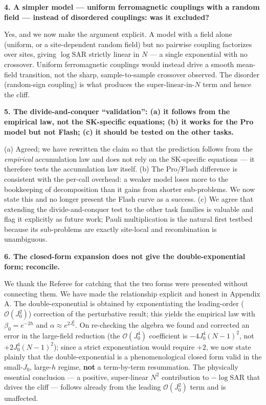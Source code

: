 \documentclass[11pt]{article}
\newcommand{\point}[1]{\medskip\noindent\textbf{#1}\par\nobreak}
\begin{document}
\point{4. A simpler model --- uniform ferromagnetic couplings with a random field --- instead of
disordered couplings: was it excluded?}
Yes, and we now make the argument explicit. A model with a field alone (uniform, or a
site-dependent random field) but no pairwise coupling factorizes over sites, giving
$\log\mathrm{SAR}$ strictly linear in $N$ --- a single exponential with no crossover. Uniform
ferromagnetic couplings would instead drive a smooth mean-field transition, not the sharp,
sample-to-sample crossover observed. The disorder (random-sign coupling) is what produces the
super-linear-in-$N$ term and hence the cliff.

\point{5. The divide-and-conquer ``validation'': (a) it follows from the empirical law, not the
SK-specific equations; (b) it works for the Pro model but not Flash; (c) it should be tested on
the other tasks.}
(a) Agreed; we have rewritten the claim so that the prediction follows from the \emph{empirical}
accumulation law and does not rely on the SK-specific equations --- it therefore tests the
accumulation law itself. (b) The Pro/Flash difference is consistent with the per-call overhead:
a weaker model loses more to the bookkeeping of decomposition than it gains from shorter
sub-problems. We now state this and no longer present the Flash curve as a success. (c) We agree
that extending the divide-and-conquer test to the other task families is valuable and flag it
explicitly as future work; Pauli multiplication is the natural first testbed because its
sub-problems are exactly site-local and recombination is unambiguous.

\point{6. The closed-form expansion does not give the double-exponential form; reconcile.}
We thank the Referee for catching that the two forms were presented without connecting them. We
have made the relationship explicit and honest in Appendix A. The double-exponential is obtained
by exponentiating the leading-order ($\mathcal{O}(J_0^2)$) correction of the perturbative result;
this yields the empirical law with $\beta_0=e^{-2h}$ and $\alpha\approx e^{2J_0^2}$. On
re-checking the algebra we found and corrected an error in the large-field reduction (the
$\mathcal{O}(J_0^4)$ coefficient is $-4J_0^4(N-1)^2$, not $+2J_0^4(N-1)^2$); since a strict
exponentiation would require $+2$, we now state plainly that the double-exponential is a
phenomenological closed form valid in the small-$J_0$, large-$h$ regime, \textbf{not} a
term-by-term resummation. The physically essential conclusion --- a positive, super-linear $N^2$
contribution to $-\log\mathrm{SAR}$ that drives the cliff --- follows already from the leading
$\mathcal{O}(J_0^2)$ term and is unaffected.
\end{document}
